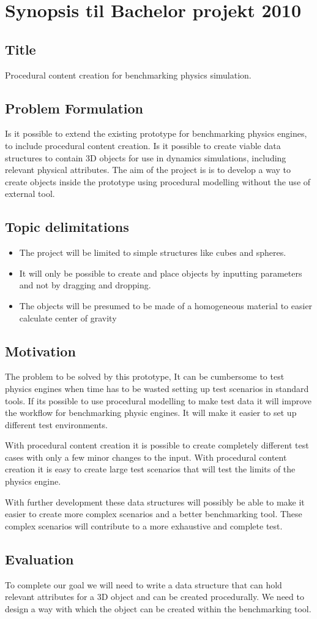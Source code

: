 \documentclass[a4paper, 12pt]{article}
\begin{document}
\section*{Synopsis til Bachelor projekt 2010}
\subsection*{Title}
Procedural content creation for benchmarking physics simulation.
\subsection*{Problem Formulation}
Is it possible to extend the existing prototype for benchmarking physics engines, to include procedural content
creation.
Is it possible to create viable data structures to contain 3D objects for use in dynamics simulations, including relevant physical attributes. The aim of the
project is is to develop a way to create objects inside the prototype using procedural modelling without the use of external tool.

\subsection*{Topic delimitations}
	\begin{itemize}
	\item The project will be limited to simple structures like cubes and spheres. 
	\item It will only be possible to create and place objects by inputting parameters and not by dragging and
	dropping.
	\item The objects will be presumed to be made of a homogeneous material to easier calculate center of gravity
	\end{itemize}
\subsection*{Motivation}
The problem to be solved by this prototype, It can be cumbersome to test physics engines when time has to be wasted
setting up test scenarios in standard tools. If its possible to use procedural modelling to make test data it will
improve the workflow for benchmarking physic engines. It will make it easier to set up different test environments. 

With procedural content creation it is possible to create completely different test cases with only a few minor changes
to the input. With procedural content creation it is easy to create large test scenarios that will test the limits of the
physics engine. 

With further development these data structures will possibly be able to make it easier to create more complex scenarios
and a better benchmarking tool. These complex scenarios will contribute to a more exhaustive and complete test.
\subsection*{Evaluation}
To complete our goal we will need to write a data structure that can hold relevant attributes for a 3D object and can be
created procedurally. We need to design a way with which the object can be created within the benchmarking tool.
\end{document}
